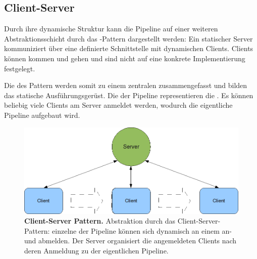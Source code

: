 \subsection{Client-Server}
Durch ihre dynamische Struktur kann die Pipeline auf einer weiteren
Abstraktionsschicht durch das -Pattern dargestellt werden:
Ein statischer Server kommuniziert über eine definierte Schnittstelle mit
dynamischen Clients.
Clients können kommen und gehen und sind nicht auf eine konkrete
Implementierung festgelegt. 

Die  des  Pattern werden somit zu einem
zentralen  zusammengefasst und bilden das statische
Ausführungsgerüst.
Die  der Pipeline representieren die .
Es können beliebig viele Clients am Server anmeldet werden, wodurch die
eigentliche Pipeline aufgebaut wird.

\begin{figure}[htbp]
	\begin{center}
		\includegraphics[scale=0.6]{pics/serverClient2.png}
	\caption[Client Server]{
	\textbf{Client-Server Pattern.}
	Abstraktion durch das Client-Server-Pattern: einzelne  der
	Pipeline können sich dynamisch an einem  an- und abmelden.
	Der Server organisiert die angemeldeten Clients nach deren Anmeldung zu der
	eigentlichen Pipeline.}
	\end{center}
	\label{fig:clientServer2}
\end{figure}

